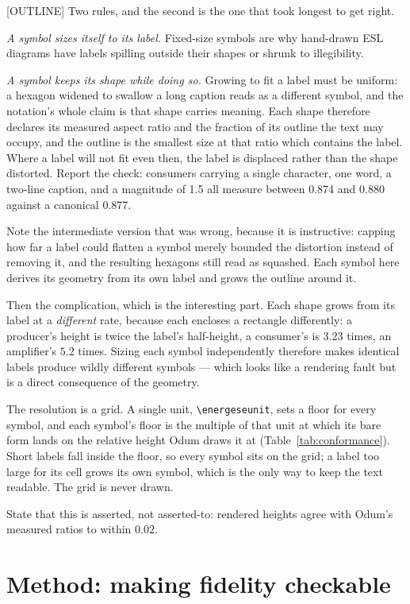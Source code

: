 [OUTLINE] Two rules, and the second is the one that took longest to get right.

\emph{A symbol sizes itself to its label.} Fixed-size symbols are why hand-drawn
ESL diagrams have labels spilling outside their shapes or shrunk to
illegibility.

\emph{A symbol keeps its shape while doing so.} Growing to fit a label must be
uniform: a hexagon widened to swallow a long caption reads as a different
symbol, and the notation's whole claim is that shape carries meaning. Each shape
therefore declares its measured aspect ratio and the fraction of its outline the
text may occupy, and the outline is the smallest size at that ratio which
contains the label. Where a label will not fit even then, the label is displaced
rather than the shape distorted. Report the check: consumers carrying a single
character, one word, a two-line caption, and a magnitude of 1.5 all measure
between 0.874 and 0.880 against a canonical 0.877.

Note the intermediate version that was wrong, because it is instructive: capping
how far a label could flatten a symbol merely bounded the distortion instead of
removing it, and the resulting hexagons still read as squashed. Each symbol here
derives its geometry from its own label and grows the outline around it.

Then the complication, which is the interesting part. Each shape grows from its
label at a \emph{different} rate, because each encloses a rectangle differently:
a producer's height is twice the label's half-height, a consumer's is $3.23$
times, an amplifier's $5.2$ times. Sizing each symbol independently therefore
makes identical labels produce wildly different symbols --- which looks like a
rendering fault but is a direct consequence of the geometry.

The resolution is a grid. A single unit, \verb|\energeseunit|, sets a floor for
every symbol, and each symbol's floor is the multiple of that unit at which its
bare form lands on the relative height Odum draws it at
(Table~\ref{tab:conformance}). Short labels fall inside the floor, so every
symbol sits on the grid; a label too large for its cell grows its own symbol,
which is the only way to keep the text readable. The grid is never drawn.

State that this is asserted, not asserted-to: rendered heights agree with Odum's
measured ratios to within $0.02$.

\section{Method: making fidelity checkable}
\label{sec:method}

